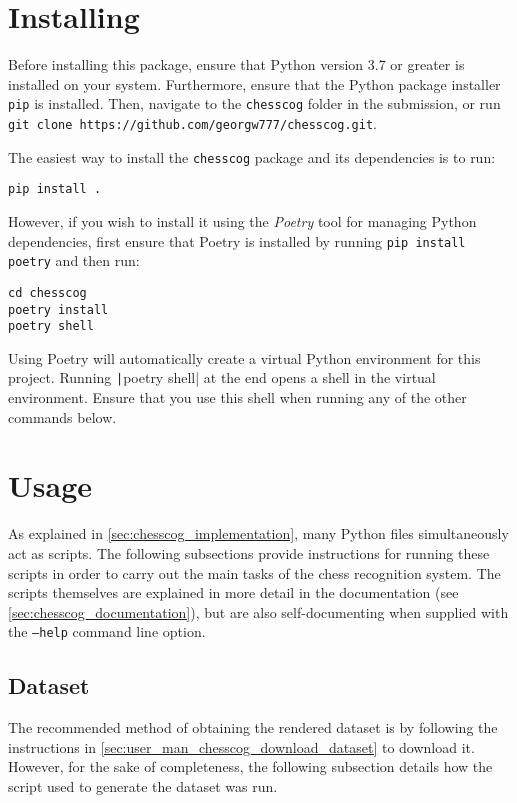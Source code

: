 \documentclass[../../report.tex]{subfiles}
\begin{document}
\section{Installing}
\label{sec:chesscog_installing}
Before installing this package, ensure that Python version 3.7 or greater is installed on your system.
Furthermore, ensure that the Python package installer \texttt{pip} is installed.
Then, navigate to the \texttt{chesscog} folder in the submission, or run \texttt{git clone https://github.com/georgw777/chesscog.git}.

The easiest way to install the \texttt{chesscog} package and its dependencies is to run:
\begin{verbatim}
pip install .
\end{verbatim}

However, if you wish to install it using the \emph{Poetry} tool for managing Python dependencies, first ensure that Poetry is installed by running \texttt{pip install poetry} and then run:
\begin{verbatim}
cd chesscog
poetry install
poetry shell
\end{verbatim}
Using Poetry will automatically create a virtual Python environment for this project.
Running \texttt|poetry shell| at the end opens a shell in the virtual environment. 
Ensure that you use this shell when running any of the other commands below.

\section{Usage}

As explained in \cref{sec:chesscog_implementation}, many Python files simultaneously act as scripts.
The following subsections provide instructions for running these scripts in order to carry out the main tasks of the chess recognition system.
The scripts themselves are explained in more detail in the documentation (see \cref{sec:chesscog_documentation}), but are also self-documenting when supplied with the \texttt{--help} command line option.

\subsection{Dataset}
\label{sec:user_man_chesscog_dataset}

The recommended method of obtaining the rendered dataset is by following the instructions in \cref{sec:user_man_chesscog_download_dataset} to download it.
However, for the sake of completeness, the following subsection details how the script used to generate the dataset was run.
\end{document}
